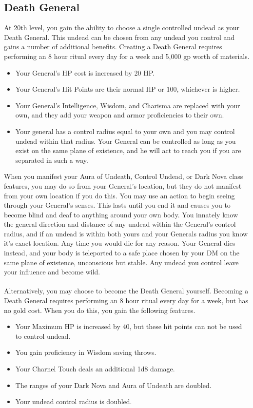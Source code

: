 \documentclass[10pt,twoside,twocolumn,openany]{book}
\begin{document}
\subsection{Death General}
At 20th level, you gain the ability to choose a single controlled undead as your Death General. This undead can be chosen from any undead you control and gains a number of additional benefits.
Creating a Death General requires performing an 8 hour ritual every day for a week and 5,000 gp worth of materials.
\begin{itemize}
\item Your General’s HP cost is increased by 20 HP.
\item Your General’s Hit Points are their normal HP or 100, whichever is higher.
\item Your General’s Intelligence, Wisdom, and Charisma are replaced with your own, and they add your weapon and armor proficiencies to their own.
\item Your general has a control radius equal to your own and you may control undead within that radius. Your General can be controlled as long as you exist on the same plane of existence, and he will act to reach you if you are separated in such a way.
\end{itemize}
When you manifest your Aura of Undeath, Control Undead, or Dark Nova class features, you may do so from your General’s location, but they do not manifest from your own location if you do this.
You may use an action to begin seeing through your General’s senses. This lasts until you end it and causes you to become blind and deaf to anything around your own body.
You innately know the general direction and distance of any undead within the General’s control radius, and if an undead is within both yours and your Generals radius you know it’s exact location.
Any time you would die for any reason. Your General dies instead, and your body is teleported to a safe place chosen by your DM on the same plane of existence, unconscious but stable. Any undead you control leave your influence and become wild.\\\\
Alternatively, you may choose to become the Death General yourself. Becoming a Death General requires performing an 8 hour ritual every day for a week, but has no gold cost. When you do this, you gain the following features.

\begin{itemize}
\item Your Maximum HP is increased by 40, but these hit points can not be used to control undead.
\item You gain proficiency in Wisdom saving throws.
\item Your Charnel Touch deals an additional 1d8 damage.
\item The ranges of your Dark Nova and Aura of Undeath are doubled.
\item Your undead control radius is doubled.
\end{itemize}
\end{document}

